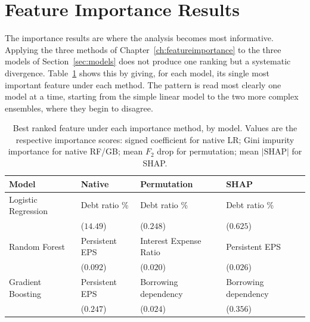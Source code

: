 \section{Feature Importance Results}
\label{sec:res-fi}

The importance results are where the analysis becomes most informative. Applying the
three methods of Chapter~\ref{ch:featureimportance} to the three models of Section~\ref{sec:models} does not
produce one ranking but a systematic divergence. Table~\ref{tab:divergence} shows this
by giving, for each model, its single most important feature under each method.
The pattern is read most clearly one model at a time, starting from the simple 
linear model to the two more complex ensembles, where they begin to disagree.

\begin{table}[htbp]
  \centering
  \caption{Best ranked feature under each importance method, by model. Values are the
    respective importance scores: signed coefficient for native LR; Gini impurity importance
    for native RF/GB; mean $F_2$ drop for permutation; mean $|\text{SHAP}|$ for SHAP.}
  \label{tab:divergence}
  \begin{tabular}{llll}
    \toprule
    \textbf{Model} & \textbf{Native} & \textbf{Permutation} & \textbf{SHAP} \\
    \midrule
    Logistic Regression & Debt ratio \% & Debt ratio \%
      & Debt ratio \% \\
                        & ($14.49$)    & ($0.248$)
      & ($0.625$) \\
    \addlinespace
    Random Forest       & Persistent EPS & Interest Expense Ratio
      & Persistent EPS \\
                        & ($0.092$)      & ($0.020$)
      & ($0.026$) \\
    \addlinespace
    Gradient Boosting   & Persistent EPS & Borrowing dependency
      & Borrowing dependency \\
                        & ($0.247$)      & ($0.024$)
      & ($0.356$) \\
    \bottomrule
  \end{tabular}
\end{table}

